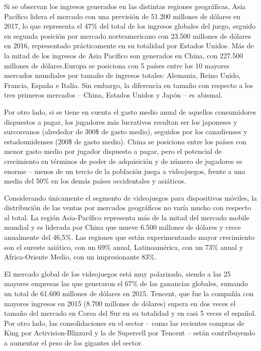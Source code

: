 Si se observan los ingresos generados en las distintas regiones geográficas, Asia Pacífico lidera el mercado con una previsión de 51.200 millones de dólares en 2017, lo que representa el 47\% del total de los ingresos globales del juego, seguido en segunda posición por mercado norteamericano con 23.500 millones de dólares en 2016, representado prácticamente en su totalidad por Estados Unidos. Más de la mitad de los ingresos de Asia Pacifico son generados en China, con 227.500 millones de dólares.Europa se posiciona con 5 países entre los 10 mayores mercados mundiales por tamaño de ingresos totales: Alemania, Reino Unido, Francia, España e Italia. Sin embargo, la diferencia en tamaño con respecto a los tres primeros mercados – China, Estados Unidos y Japón – es abismal. 

Por otro lado, si se tiene en cuenta el gasto medio anual de aquellos consumidores dispuestos a pagar, los jugadores más lucrativos resultan ser los japoneses y surcoreanos (alrededor de 300\$ de gasto medio), seguidos por los canadienses y estadounidenses (200\$ de gasto medio). China se posiciona entre los países con menor gasto medio por jugador dispuesto a pagar, pero el potencial de crecimiento en términos de poder de adquisición y de número de jugadores es enorme – menos de un tercio de la población juega a videojuegos, frente a una media del 50\% en los demás países occidentales y asiáticos.

Considerando únicamente el segmento de videojuegos para dispositivos móviles, la distribución de las ventas por mercados geográficos no varía mucho con respecto al total. La región Asia-Pacífico representa más de la mitad del mercado mobile mundial y es liderada por China que mueve 6.500 millones de dólares y crece anualmente del 46,5\%. Las regiones que están experimentando mayor crecimiento son el sureste asiático, con un 69\% anual, Latinoamérica, con un 73\% anual y Africa-Oriente Medio, con un impresionante 83\%.

El mercado global de los videojuegos está muy polarizado, siendo a las 25 mayores empresas las que generaron el 67\% de las ganancias globales, sumando un total de 61.600 millones de dólares en 2015. Tencent, que fue la compañía con mayores ingresos en 2015 (8.700 millones de dólares) supera en dos veces el tamaño del mercado en Corea del Sur en su totalidad y en casi 5 veces el español. Por otro lado, las consolidaciones en el sector – como las recientes compras de King por Activision-Blizzard y la de Supercell por Tencent – están contribuyendo a aumentar el peso de los gigantes del sector.

